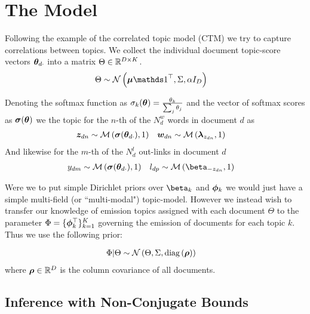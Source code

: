 

\newcommand \thdo { { \vv{\theta}_{d\cdot} } }
\newcommand \thok { { \vv{\theta}_{\cdot k} } }
\newcommand \phok { { \vv{\phi}_{\cdot k} } }
\newcommand \phdo { { \vv{\phi}_{d\cdot} } }


\section{The Model}
Following the example of the correlated topic model (CTM)\cite{Blei2006} we try to capture correlations between topics. We collect the individual document topic-score vectors $\thdo$ into a matrix $\Theta \in { \mathbb{R}^{D \times K} }$. 
\begin{align}
\Theta &\sim \mnor{\vv{\mu}\one\T}{\Sigma}{\alpha I_D}
\end{align}

Denoting the softmax function as $\sigma_k(\bm \theta) = \frac{\theta_k}{\sum_j \theta_j}$ and the vector of softmax scores as $\bm \sigma(\bm \theta)$ we 
the topic for the $n$-th of the $N^w_d$ words in document $d$ as
\begin{align}
\zdn & \sim \muln{\vv{\sigma}(\thdo)}{1} &
\wdn & \sim \muln{\vv{\lambda}_{z_{dn}}}{1}
\end{align}
And likewise for the $m$-th of the $N^l_d$ out-links in document $d$
\begin{align}
y_{dm} & \sim \muln{\vv{\sigma}(\thdo)}{1} &
l_{dp} & \sim \muln{\vv{\beta}_{- z_{dn}}}{1}
\end{align}

Were we to put simple Dirichlet priors over $\vv{\beta}_k$ and $\bm \phi_k$ we would just have a simple multi-field (or ``multi-modal") topic-model\cite{Salomatin2009}. However we instead wish to transfer our knowledge of emission topics assigned with each document $\Theta$ to the parameter $\Phi = \{ \bm \phi_k^\top \}_{k=1}^K$ governing the emission of documents for each topic $k$. Thus we use the following prior:

\begin{align}
\Phi|\Theta & \sim \mathcal{N} \left(\Theta, \Sigma, \text{diag} \left( {\bm \rho} \right)\right)
\end{align}
where $\bm \rho \in { \mathbb{R}^{D} }$ is the column covariance of all documents. 

\subsection{Inference with Non-Conjugate Bounds}
